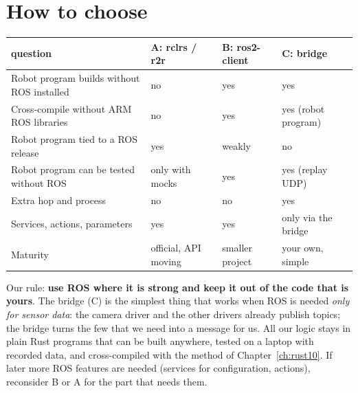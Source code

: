 \section*{How to choose}
\begin{center}
\renewcommand{\arraystretch}{1.25}
\begin{tabular}{p{4.2cm}p{2.2cm}p{2.2cm}p{2.2cm}}
\textbf{question} & \textbf{A: rclrs / r2r} & \textbf{B: ros2-client} & \textbf{C: bridge}\\ \hline
Robot program builds without ROS installed & no & yes & yes\\
Cross-compile without ARM ROS libraries & no & yes & yes (robot program)\\
Robot program tied to a ROS release & yes & weakly & no\\
Robot program can be tested without ROS & only with mocks & yes & yes (replay UDP)\\
Extra hop and process & no & no & yes\\
Services, actions, parameters & yes & yes & only via the bridge\\
Maturity & official, API moving & smaller project & your own, simple\\
\end{tabular}
\end{center}
Our rule: \textbf{use ROS where it is strong and keep it out of the code that is yours}. The bridge (C) is the simplest thing that works when ROS is needed \emph{only for sensor data}: the camera driver and the other drivers already publish topics; the bridge turns the few that we need into a message for us. All our logic stays in plain Rust programs that can be built anywhere, tested on a laptop with recorded data, and cross-compiled with the method of Chapter~\ref{ch:rust10}. If later more ROS features are needed (services for configuration, actions), reconsider B or A for the part that needs them.

